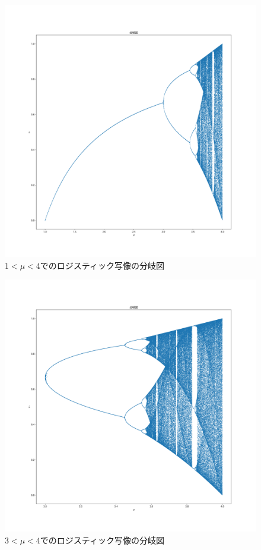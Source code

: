 \documentclass[a4paper, oneside]{jsarticle}
\begin{document}
\begin{figure}[H]
  \centering
  \includegraphics[width=150mm]{branch_1-4.png}
    \caption{$1<\mu<4$でのロジスティック写像の分岐図}
    \label{fig:branch1}
\end{figure}

\begin{figure}[H]
  \centering
  \includegraphics[width=150mm]{branch_3-4.png}
    \caption{$3<\mu<4$でのロジスティック写像の分岐図}
    \label{fig:branch2}
\end{figure}
\end{document}
